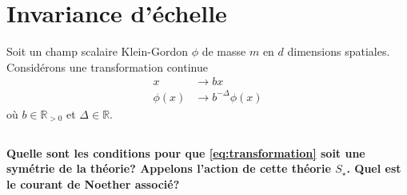 \documentclass{article}
\numberwithin{equation}{section}
\theoremstyle{solution}
\begin{document}
\section{Invariance d'échelle}
Soit un champ scalaire Klein-Gordon $\phi$ de masse $m$ en $d$ dimensions spatiales. Considérons une transformation continue
\begin{align}
        \label{eq:transformation}
        x &\rightarrow bx \\
        \phi(x) &\rightarrow b^{-\Delta}\phi(x)  
\end{align}
où $b \in \mathbb{R}_{>0}$ et $\Delta \in \mathbb{R}$.

\subsection{}
\textbf{Quelle sont les conditions pour que \eqref{eq:transformation} soit une symétrie de la théorie? Appelons l’action
de cette théorie $S_{\star}$. Quel est le courant de Noether associé?}
\vspace{2ex}
\end{document}
